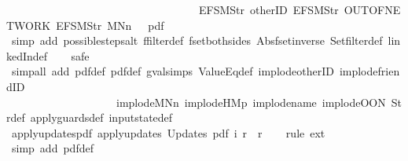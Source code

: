 \begin{isabellebody}
\ \ \ \ \ \ \ \ \ \ \ \ \ \ \ \ \ \ \ \ \ \ \ \ \ \ \ \ \ \ \ \ \ \ \ {\isacharbrackleft}EFSM{\isachardot}Str\ {\isacharprime}{\isacharprime}otherID{\isacharprime}{\isacharprime}{\isacharcomma}\ EFSM{\isachardot}Str\ {\isacharprime}{\isacharprime}OUT{\isacharunderscore}OF{\isacharunderscore}NETWORK{\isacharprime}{\isacharprime}{\isacharcomma}\ EFSM{\isachardot}Str\ {\isacharprime}{\isacharprime}MNn{}{\isacharprime}{\isacharprime}{\isacharbrackright}\ {\isacharequal}\ {\isacharbraceleft}{\isacharbar}{\isacharparenleft}{}{\isacharcomma}\ pdf{}{\isacharparenright}{\isacharbar}{\isacharbraceright}{\isachardoublequoteclose}\isanewline
%
\isadelimproof
\ \ %
\endisadelimproof
%
\isatagproof
{}\isamarkupfalse%
\ {\isacharparenleft}simp\ add{\isacharcolon}\ possible{\isacharunderscore}steps{\isacharunderscore}alt\ ffilter{\isacharunderscore}def\ fset{\isacharunderscore}both{\isacharunderscore}sides\ Abs{\isacharunderscore}fset{\isacharunderscore}inverse\ Set{\isachardot}filter{\isacharunderscore}def\ linkedIn{\isacharunderscore}def{\isacharparenright}\isanewline
\ \ \isamarkupfalse%
\ safe\isanewline
\ \ \isamarkupfalse%
\ {\isacharparenleft}simp{\isacharunderscore}all\ add{\isacharcolon}\ pdf{\isacharunderscore}def\ pdf{}{\isacharunderscore}def\ gval{\isachardot}simps\ ValueEq{\isacharunderscore}def\ implode{\isacharunderscore}otherID\ implode{\isacharunderscore}friendID\isanewline
\ \ \ \ \ \ \ \ \ \ \ \ \ \ \ \ \ \ \ \ implode{\isacharunderscore}MNn{}\ implode{\isacharunderscore}HM{}p\ implode{\isacharunderscore}name\ implode{\isacharunderscore}OON\ Str{\isacharunderscore}def\ apply{\isacharunderscore}guards{\isacharunderscore}def\ input{}state{\isacharunderscore}def{\isacharparenright}%
\endisatagproof
{\isafoldproof}%
%
\isadelimproof
\isanewline
%
\endisadelimproof
\isanewline
{}\isamarkupfalse%
\ apply{\isacharunderscore}updates{\isacharunderscore}pdf{}{\isacharcolon}\ {\isachardoublequoteopen}apply{\isacharunderscore}updates\ {\isacharparenleft}Updates\ pdf{}{\isacharparenright}\ i\ r\ {\isacharequal}\ r{\isachardoublequoteclose}\isanewline
%
\isadelimproof
\ \ %
\endisadelimproof
%
\isatagproof
{}\isamarkupfalse%
\ {\isacharparenleft}rule\ ext{\isacharparenright}\isanewline
\ \ \isamarkupfalse%
\ {\isacharparenleft}simp\ add{\isacharcolon}\ pdf{}{\isacharunderscore}def{\isacharparenright}%
\endisatagproof
{\isafoldproof}%
%
\isadelimproof
\isanewline

\end{isabellebody}
